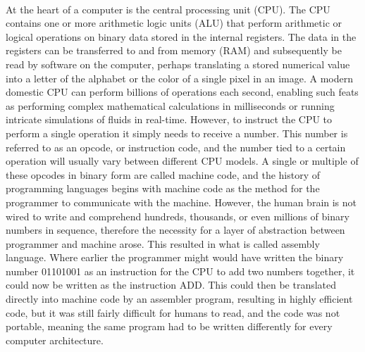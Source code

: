 \documentclass{report}%
\begin{document}
\vspace{0.5cm}

\hrulefill

\vspace{0.5cm}

\paragraph{}
At the heart of a computer is the central processing unit (CPU). The CPU contains one or more arithmetic logic units (ALU) that perform arithmetic or logical operations on binary data stored in the internal registers. The data in the registers can be transferred to and from memory (RAM) and subsequently be read by software on the computer, perhaps translating a stored numerical value into a letter of the alphabet or the color of a single pixel in an image. A modern domestic CPU can perform billions of operations each second, enabling such feats as performing complex mathematical calculations in milliseconds or running intricate simulations of fluids in real-time. However, to instruct the CPU to perform a single operation it simply needs to receive a number. This number is referred to as an opcode, or instruction code, and the number tied to a certain operation will usually vary between different CPU models. A single or multiple of these opcodes in binary form are called machine code, and the history of programming languages begins with machine code as the method for the programmer to communicate with the machine. However, the human brain is not wired to write and comprehend hundreds, thousands, or even millions of binary numbers in sequence, therefore the necessity for a layer of abstraction between programmer and machine arose. This resulted in what is called assembly language. Where earlier the programmer might would have written the binary number 01101001 as an instruction for the CPU to add two numbers together, it could now be written as the instruction ADD. This could then be translated directly into machine code by an assembler program, resulting in highly efficient code, but it was still fairly difficult for humans to read, and the code was not portable, meaning the same program had to be written differently for every computer architecture.
\end{document}
